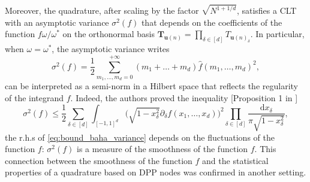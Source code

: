 \documentclass[twoside,11pt]{book}
\newtheorem{theorem}{Theorem}
\numberwithin{theorem}{chapter}
\numberwithin{definition}{chapter}
\numberwithin{proposition}{chapter}
\numberwithin{corollary}{chapter}
\numberwithin{example}{chapter}
\numberwithin{lemma}{chapter}
\numberwithin{assumption}{chapter}
\begin{document}
 Moreover, the quadrature, after scaling by the factor $\sqrt{N^{1+1/d}}$, satisfies a CLT with an asymptotic variance $\sigma^{2}(f)$ that depends on the coefficients of the function $\displaystyle f \omega / \omega^{*}$ on the orthonormal basis $\bm{T}_{\bm{u}(n)} = \prod\limits_{ \delta \in [d]} T_{\bm{u}(n)_{\delta}}$. In particular, when $\omega = \omega^{*}$, the asymptotic variance writes
\begin{equation}
\sigma^{2}(f) = \frac{1}{2} \sum\limits_{m_{1}, \dots , m_{d} = 0}^{+\infty} (m_{1}+\dots +m_{d}) \widehat{f} (m_{1}, \dots, m_{d})^{2},
\end{equation}
can be interpreted as a semi-norm in a Hilbert space that reflects the regularity of the integrand $f$. Indeed, the authors proved the inequality [Proposition 1 in \citep{BaHa16}]
\begin{equation}\label{eq:bound_baha_variance}
\sigma^{2}(f) \leq \frac{1}{2} \sum\limits_{\delta \in [d]} \int_{[-1,1]^{d}} \bigg(\sqrt{1-x_{\delta}^{2}} \partial_{\delta}f(x_{1}, \dots,x_{d}) \bigg)^{2} \prod\limits_{\delta \in [d]} \frac{\mathrm{d}x_{\delta}}{\pi \sqrt{1-x_{\delta}^{2}}},
\end{equation}
the r.h.s of \eqref{eq:bound_baha_variance} depends on the fluctuations of the function $f$: $\sigma^{2}(f)$ is a measure of the smoothness of the function $f$. This connection between the smoothness of the function $f$ and the statistical properties of a quadrature based on DPP nodes was confirmed in another setting.









\end{document}
